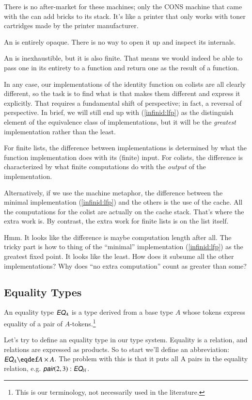 \documentclass{article}
\begin{document}
There is no after-market for these machines; only the \textsf{CONS}
machine that came with the \IBMMM can add bricks to its stack. It's
like a printer that only works with toner cartridges made by the
printer manufacturer.

An \IBMMM is entirely opaque. There is no way to open it up and
inspect its internals.

An \IBMMM is inexhaustible, but it is also finite. That means we would
indeed be able to pass one in its entirety to a function and return
one as the result of a function.

In any case, our implementations of the identity function on colists
are all clearly different, so the task is to find what is that makes
them different and express it explicitly. That requires a fundamental
shift of perspective; in fact, a reversal of perspective. In brief, we
will still end up with (\ref{infinid:lfp}) as the distinguish element
of the equivalence class of implementations, but it will be the
\textit{greatest} implementation rather than the least.

For finite lists, the difference between implementations is determined
by what the function implementation does with its (finite) input. For
colists, the difference is characterized by what finite
computations do with the \textit{output} of the implementation.

Alternatively, if we use the machine metaphor, the difference between
the minimal implementation (\ref{infinid:lfp}) and the others is the
use of the cache. All the computations for the colist are actually on
the cache stack. That's where the extra work is. By contrast, the
extra work for finite lists is on the list itself.

Hmm. It looks like the difference is maybe computation length after
all. The tricky part is how to thing of the ``minimal'' implementation
(\ref{infinid:lfp}) as the greatest fixed point. It looks like the
least. How does it subsume all the other implementations? Why does
``no extra computation'' count as greater than some?

\subsection{Equality Types}
An equality type \(\EQ_A\) is a type derived from a base type \(A\)
whose tokens express equality of a pair of \(A\)-tokens.\footnote{This is our terminology, not necessarily used in the literature.}

Let's try to define an equality type in our type system. Equality is a
relation, and relations are expressed as products. So to start we'll
define an abbreviation: \(\EQ_A\defeq A\times A\). The problem with
this is that it puts all A pairs in the equality relation, e.g.
\(\pair(2,3):\EQ_{\Nat}\).
\end{document}
